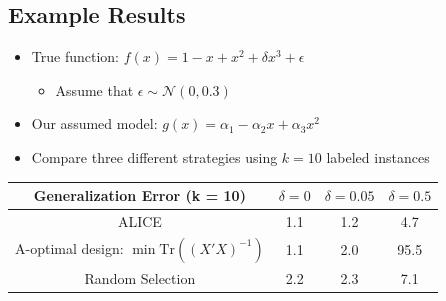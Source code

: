 \documentclass[10pt]{article}
\begin{document}
\subsection*{Example Results}
\begin{itemize}
	\item True function: $f(x) = 1 - x + x^2 + \delta x^3 + \epsilon$
	\begin{itemize}
	    \item Assume that $\epsilon \sim \mathcal{N}(0, 0.3)$
    \end{itemize}
    \item Our assumed model: $g(x) = \alpha_1 - \alpha_2 x + \alpha_3 x^2$
    \item Compare three different strategies using $k = 10$ labeled instances
\end{itemize}
\begin{center}
    \begin{tabular}{|c|c|c|c|}
    \hline
    Generalization Error (k = 10) & $\delta = 0$ & $\delta = 0.05$ & $\delta = 0.5$ \\ \hline
    ALICE & 1.1 & 1.2 & 4.7 \\ \hline
    A-optimal design: $\min \text{Tr}\left((X'X)^{-1}\right)$ & 1.1 & 2.0 & 95.5 \\ \hline
    Random Selection & 2.2 & 2.3 & 7.1 \\ \hline
    \end{tabular}
\end{center}
\end{document}
